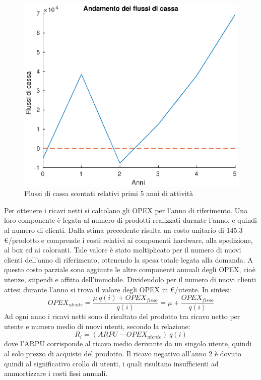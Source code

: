 
%
\begin{figure}[!h]
\centering
\includegraphics[width=\textwidth]{figures/cf}
\caption{Flussi di cassa scontati relativi primi 5 anni di attività}
\label{cf}
\end{figure}
%
Per ottenere i ricavi netti si calcolano gli OPEX per l’anno di riferimento.
Una loro componente è legata al numero di prodotti realizzati durante l’anno, e
quindi al numero di clienti. Dalla stima precedente risulta un costo unitario di
145.3 \euro/prodotto e comprende i costi relativi ai componenti hardware, alla
spedizione, al box ed ai coloranti. Tale valore è stato moltiplicato per il
numero di nuovi clienti dell’anno di riferimento, ottenendo la spesa totale
legata alla domanda.
A questo costo parziale sono aggiunte le altre componenti annuali degli OPEX,
cioè utenze, stipendi e affitto dell’immobile. Dividendolo per il numero di
nuovi clienti attesi durante l’anno si trova il valore degli OPEX in
\euro/utente. In sintesi:
\begin{displaymath}
	OPEX_{utente} = \frac{\mu \ q(i) + OPEX_{fisso}}{q(i)} = \mu +
    \frac{OPEX_{fisso}}{q(i)}
\end{displaymath}
Ad ogni anno i ricavi netti sono il risultato del prodotto tra ricavo netto per
utente e numero medio di nuovi utenti, secondo la relazione:
\begin{displaymath}
	R_i = (ARPU - OPEX_{utente}) \ q(i)
\end{displaymath}
dove l’ARPU corrisponde al ricavo medio derivante da un singolo utente, quindi
al solo prezzo di acquisto del prodotto.  Il ricavo negativo all’anno 2 è dovuto
quindi al significativo crollo di utenti, i quali risultano insufficienti ad
ammortizzare i costi fissi annuali.
